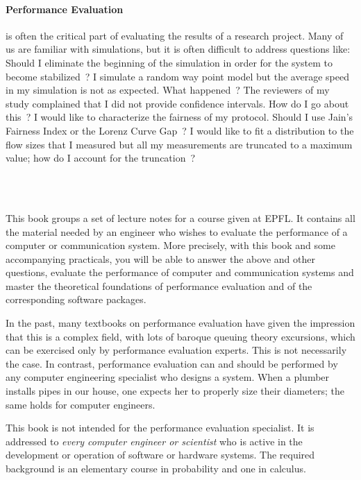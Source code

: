 \begin{minipage}[b]{0.6\textwidth}
\paragraph{Performance Evaluation} is often the critical part of
evaluating the results of a research project. Many of us are
familiar with simulations, but it is often difficult to address
questions like: Should I eliminate the beginning of the
simulation in order for the system to become stabilized~? I
simulate a random way point model but the average speed in my
simulation is not as expected. What happened~? The reviewers of
my study complained that I did not provide confidence
intervals. How do I go about this~? I would like to characterize the
fairness of my protocol. Should I use Jain's Fairness Index or
the Lorenz Curve Gap~? I would like to fit a distribution to
the flow sizes that I measured but all my measurements are
truncated to a maximum value; how do I account for the
truncation~?
\end{minipage}
%
\begin{minipage}[b]{0.4\textwidth}
\hfill{}\\
\end{minipage}\\

This book groups a set of lecture notes for a course given at
EPFL. It contains all the material needed by an engineer who
wishes to evaluate the performance of a computer or
communication system. More precisely, with this book and some
accompanying practicals, you will be able to answer the above and
other questions, evaluate the performance of computer and
communication systems and master the theoretical foundations
of performance evaluation and of the corresponding software
packages.

In the past, many textbooks on performance evaluation have given
the impression that this is a complex field, with lots of baroque
queuing theory excursions, which can be exercised only by
performance evaluation experts. This is not necessarily the case. In
contrast, performance evaluation can and should be performed by
any computer engineering specialist who designs a system. When a
plumber installs pipes in our house, one expects her to properly
size their diameters; the same holds for computer engineers.

This book is not intended for the performance evaluation specialist. It
is addressed to \emph{every computer engineer or scientist} who is
active in the development or operation of software or hardware
systems. The required background is an elementary course in
probability and one in calculus.

